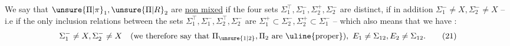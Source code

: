 \noindent\begin{minipage}[t]{.04\linewidth}
\vspace{1.2\baselineskip}
\end{minipage}\hfill\begin{minipage}[t]{.94\linewidth}
\vspace{0pt}
\uline{} We say that $\unsure{\Pi|\pi}_1,\unsure{\Pi|R}_2$ are \uline{ non mixed}  if the four sets $\Sigma_1^\top,\Sigma_1^-,\Sigma_2^+,\Sigma_2^-$ are distinct,  if  in addition $\Sigma_1^-\ne X,\Sigma_2^-\ne X$ -- i.e if the only inclusion relations between the sets $\Sigma_1^\top,\Sigma_1^-,\Sigma_2^\top,\Sigma_2^-$ are $\Sigma_1^+\subset\Sigma_2^-,\Sigma_2^+\subset\Sigma_1^-$ -- which also means that we have :
\[
\Sigma_1^-\ne X,\Sigma_2^-\ne X
\quad(\text{we therefore say that }\Pi_{\unsure{1|2}},\Pi_2\text{ are \uline{proper}}),
\ E_1\ne\Sigma_{12},E_2\ne\Sigma_{12}.
\tag*{(21)}
\]
\end{minipage}
\endgroup
\clearpage
